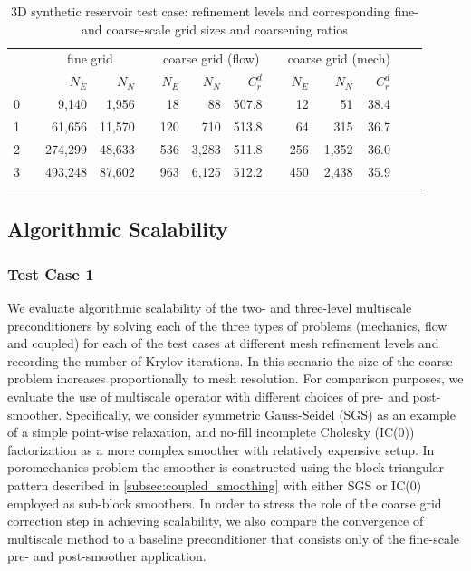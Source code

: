 \begin{table}
    \centering
    \caption[3D synthetic reservoir test case refinement problem sizes]{3D synthetic reservoir test case: refinement levels and corresponding fine- and coarse-scale grid sizes and coarsening ratios}
    \label{tab:mazumodel2_matlab_dims}
    \begin{tabular}{rrrrrrrrrrrrcc}
      \hline\noalign{\smallskip}
      \multirow{2}{*}{$\ell$} & & \multicolumn{2}{c}{fine grid} & & \multicolumn{3}{c}{coarse grid (flow)} & & \multicolumn{3}{c}{coarse grid (mech)} \\
      \noalign{\smallskip}\cline{3-4} \cline{6-8} \cline{10-12}\noalign{\smallskip}
      & & $N_E$ & $N_N$ & & $N_E$ & $N_N$ & $C_r^d$ & & $N_E$ & $N_N$ & $C_r^d$ \\
      \hline\noalign{\smallskip}
        0 & &   9,140 &  1,956 & &  18 &    88 & 507.8 & &  12 &    51 & 38.4 \\
        1 & &  61,656 & 11,570 & & 120 &   710 & 513.8 & &  64 &   315 & 36.7 \\
        2 & & 274,299 & 48,633 & & 536 & 3,283 & 511.8 & & 256 & 1,352 & 36.0 \\
        3 & & 493,248 & 87,602 & & 963 & 6,125 & 512.2 & & 450 & 2,438 & 35.9 \\
      \hline\noalign{\smallskip}
    \end{tabular}
\end{table}

\subsection{Algorithmic Scalability}

\subsubsection{Test Case 1}

We evaluate algorithmic scalability of the two- and three-level multiscale preconditioners by solving each of the three types of problems (mechanics, flow and coupled) for each of the test cases at different mesh refinement levels and recording the number of Krylov iterations.   In this scenario the size of the coarse problem increases proportionally to mesh resolution.   For comparison purposes, we evaluate the use of multiscale operator with different choices of pre- and post-smoother.   Specifically, we consider symmetric Gauss-Seidel (SGS) as an example of a simple point-wise relaxation, and no-fill incomplete Cholesky (IC(0)) factorization as a more complex smoother with relatively expensive setup.   In poromechanics problem the smoother is constructed using the block-triangular pattern described in \cref{subsec:coupled_smoothing} with either SGS or IC(0) employed as sub-block smoothers.   In order to stress the role of the coarse grid correction step in achieving scalability, we also compare the convergence of multiscale method to a baseline preconditioner that consists only of the fine-scale pre- and post-smoother application.


